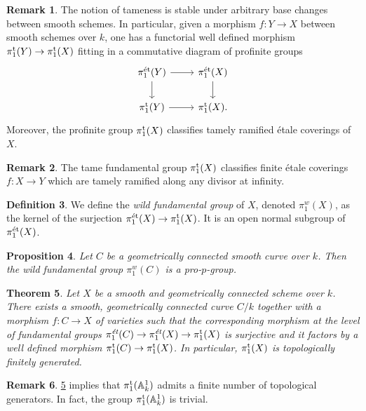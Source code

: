 \documentclass[10pt,a4paper]{amsart}
\numberwithin{equation}{subsection}
\theoremstyle{plain}
\newtheorem{theorem}{Theorem}[section]
\newtheorem{prop}[theorem]{Proposition}
\theoremstyle{definition}
\newtheorem{defi}[theorem]{Definition}
\newtheorem{rema}[theorem]{Remark}
\theoremstyle{remark}
\numberwithin{equation}{section}
\begin{document}
\begin{rema} The notion of tameness is stable under arbitrary base changes between smooth schemes. In particular, given
a morphism $f \colon Y \to X$ between smooth schemes over $k$, one has a functorial well defined morphism $\pi_1^{\mathrm{t}} (Y) \to \pi_1^{\mathrm{t}}(X)$ fitting in a commutative
diagram of profinite groups
    \[
    \begin{tikzcd}
        \pi_1^\et(Y) \ar{r} \ar{d} & \pi_1^\et(X) \ar{d} \\
        \tamepi(Y) \ar{r} & \tamepi(X).
    \end{tikzcd}
    \]
Moreover, the profinite group $\pi_1^{\mathrm{t}}(X)$ classifies tamely ramified \'etale coverings of $X$.
\end{rema}


\begin{rema}
The tame fundamental group $\pi_1^{\mathrm{t}}(X)$ classifies finite \'etale coverings $f \colon X \to Y$ which are tamely ramified
along any divisor at infinity.
\end{rema}

\begin{defi}
We define the \emph{wild fundamental group} of $X$, denoted $\pi_1^w(X)$, as the kernel of the surjection $\pi_1^{\text{\'et}}(X) \to
\pi_1^{\mathrm{t}}(X)$. It is an open normal subgroup of $\pi_1^{\text{\'et}}(X)$.
\end{defi}

\begin{prop}{\cite{Clark}}
Let $C$ be a geometrically connected smooth curve over $k$. Then the wild fundamental group $\pi_1^w(C)$ is a pro-$p$-group.
\end{prop}

\begin{theorem}{\cite[Appendix 1, Theorem 1]{cadoret}} \label{cadoret}
Let $X$ be a smooth and geometrically connected scheme over $k$. There exists a smooth, geometrically connected curve
$C/ k$ together with a morphism $f \colon C \to X$ of varieties such that the corresponding morphism at the level of
fundamental groups $\pi_1^{\emph{\text{\'et}}}(C) \to \pi_1^{\emph{\text{\'et}}}(X) \to \pi_1^{\mathrm{t}}(X)$ is surjective and it factors by a well defined morphism
$\pi_1^{\mathrm{t}}(C) \to \pi_1^{\mathrm{t}}(X)$. In particular, $\pi_1^{\mathrm{t}}(X)$ is topologically finitely generated.
\end{theorem}

\begin{rema}
\cref{cadoret} implies that $\pi_1^{\mathrm{t}} (\mathbb A^1_k)$ admits a finite number
of topological generators. In fact, the group $\pi_1^{\mathrm{t}}(\mathbb A^1_k)$ is trivial.
\end{rema}
\end{document}
